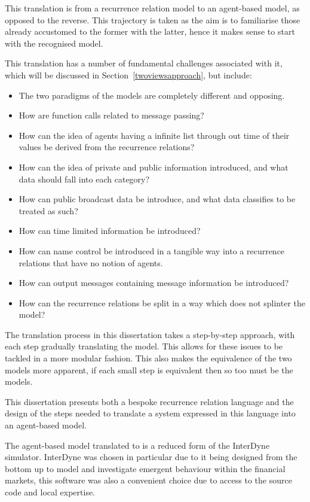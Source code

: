 \documentclass{article}
\begin{document}
This translation is from a recurrence relation model to an agent-based model, as opposed to the reverse. This trajectory is taken as the aim is to familiarise those already accustomed to the former with the latter, hence it makes sense to start with the recognised model.  

This translation has a number of fundamental challenges associated with it, which will be discussed in Section~\ref{twoviewsapproach}, but include:
\begin{itemize}
   \item The two paradigms of the models are completely different and opposing. 
   \item How are function calls related to message passing?
   \item How can the idea of agents having a infinite list through out time of their values be derived from the recurrence relations? 
   \item How can the idea of private and public information introduced, and what data should fall into each category? 
   \item How can public broadcast data be introduce, and what data classifies to be treated as such? 
   \item How can time limited information be introduced?
   \item How can name control be introduced in a tangible way into a recurrence relations that have no notion of agents. 
   \item How can output messages containing message information be introduced? 
   \item How can the recurrence relations be split in a way which does not splinter the model? 
\end{itemize}

The translation process in this dissertation takes a step-by-step approach, with each step gradually translating the model. This allows for these issues to be tackled in a more modular fashion. This also makes the equivalence of the two models more apparent, if each small step is equivalent then so too must be the models.  

This dissertation presents both a bespoke recurrence relation language and the design of the steps needed to translate a system expressed in this language into an agent-based model. 

The agent-based model translated to is a reduced form of the InterDyne simulator. InterDyne was chosen in particular due to it being designed from the bottom up to model and investigate emergent behaviour within the financial markets, this software was also a convenient choice due to access to the source code and local expertise.   
\end{document}
